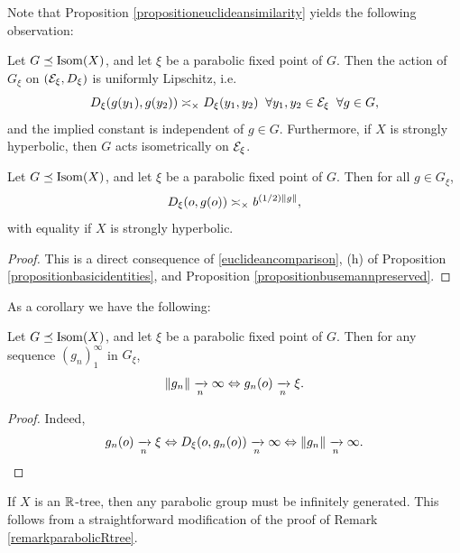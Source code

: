 Note that Proposition \ref{propositioneuclideansimilarity} yields the following observation:
\begin{observation}
\label{observationuniformlyLipschitz}
Let $G\preceq\operatorname{Isom}(X)$, and let $\xi$ be a parabolic fixed point of $G$. Then the action of $G_\xi$ on $(\mathcal E_\xi,D_\xi)$ is uniformly Lipschitz, i.e.
\[
D_\xi(g(y_1),g(y_2)) \asymp_\times D_\xi (y_1,y_2) \;\;\forall y_1,y_2\in\mathcal E_\xi\;\;\forall g\in G,
\]
and the implied constant is independent of $g\in G$. Furthermore, if $X$ is strongly hyperbolic, then $G$ acts isometrically on $\mathcal E_\xi$.
\end{observation}

\begin{observation}
\label{observationeuclideanparabolicasymp}
Let $G\preceq\operatorname{Isom}(X)$, and let $\xi$ be a parabolic fixed point of $G$. Then for all $g\in G_\xi$,
\begin{equation}
\label{euclideanparabolicasymp}
D_\xi(o,g(o)) \asymp_\times b^{(1/2)\|g\|},
\end{equation}
with equality if $X$ is strongly hyperbolic.
\end{observation}
\begin{proof}
This is a direct consequence of \eqref{euclideancomparison}, (h) of Proposition \ref{propositionbasicidentities}, and Proposition \ref{propositionbusemannpreserved}.
\end{proof}

As a corollary we have the following:
\begin{observation}
\label{observationparabolic}
Let $G\preceq\operatorname{Isom}(X)$, and let $\xi$ be a parabolic fixed point of $G$. Then for any sequence $(g_n)_1^\infty$ in $G_\xi$,
\[
\|g_n\|\xrightarrow[n]{} \infty \Leftrightarrow g_n(o)\xrightarrow[n]{}\xi.
\]
\end{observation}
\begin{proof}
Indeed,
\[
g_n(o)\xrightarrow[n]{}\xi \Leftrightarrow D_\xi(o,g_n(o))\xrightarrow[n]{} \infty \Leftrightarrow \|g_n\|\xrightarrow[n]{} \infty.
\]
\end{proof}

\begin{remark}
\label{remarkparabolicRtree2}
If $X$ is an $\R$-tree, then any parabolic group must be infinitely generated. This follows from a straightforward modification of the proof of Remark \ref{remarkparabolicRtree}.
\end{remark}

